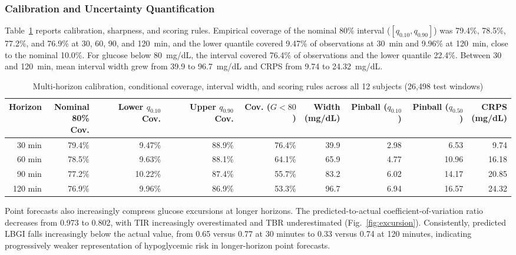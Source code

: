 \documentclass[journal]{IEEEtran}
\begin{document}
\subsubsection{Calibration and Uncertainty Quantification}
Table~\ref{tab:calibration} reports calibration, sharpness, and scoring rules. Empirical coverage of the nominal 80\% interval ($[q_{0.10}, q_{0.90}]$) was 79.4\%, 78.5\%, 77.2\%, and 76.9\% at 30, 60, 90, and 120~min, and the lower quantile covered 9.47\% of observations at 30~min and 9.96\% at 120~min, close to the nominal 10.0\%. For glucose below 80~mg/dL, the interval covered 76.4\% of observations and the lower quantile 22.4\%. Between 30 and 120~min, mean interval width grew from 39.9 to 96.7~mg/dL and CRPS from 9.74 to 24.32~mg/dL.

\begin{table}[t]
\centering
\caption{Multi-horizon calibration, conditional coverage, interval width, and scoring rules across all 12 subjects (26,498 test windows)}
\label{tab:calibration}
\footnotesize
\begin{tabular}{rrrrrrrrr}
\toprule
Horizon & \makecell{Nominal\\80\% Cov.} & \makecell{Lower\\$q_{0.10}$ Cov.} & \makecell{Upper\\$q_{0.90}$ Cov.} & \makecell{Cov.\\($G<80$)} & \makecell{Width\\(mg/dL)} & \makecell{Pinball\\($q_{0.10}$)} & \makecell{Pinball\\($q_{0.50}$)} & \makecell{CRPS\\(mg/dL)} \\
\midrule
30 min  & 79.4\% & 9.47\%  & 88.9\% & 76.4\% & 39.9 & 2.98 & 6.53  & 9.74 \\
60 min  & 78.5\% & 9.63\%  & 88.1\% & 64.1\% & 65.9 & 4.77 & 10.96 & 16.18 \\
90 min  & 77.2\% & 10.22\% & 87.4\% & 55.7\% & 83.2 & 6.02 & 14.17 & 20.85 \\
120 min & 76.9\% & 9.96\%  & 86.9\% & 53.3\% & 96.7 & 6.94 & 16.57 & 24.32 \\
\bottomrule
\end{tabular}
\end{table}



Point forecasts also increasingly compress glucose excursions at longer horizons. The predicted-to-actual coefficient-of-variation ratio decreases from 0.973 to 0.802, with TIR increasingly overestimated and TBR underestimated (Fig.~\ref{fig:excursion}). Consistently, predicted LBGI falls increasingly below the actual value, from 0.65 versus 0.77 at 30 minutes to 0.33 versus 0.74 at 120 minutes, indicating progressively weaker representation of hypoglycemic risk in longer-horizon point forecasts.
\end{document}
